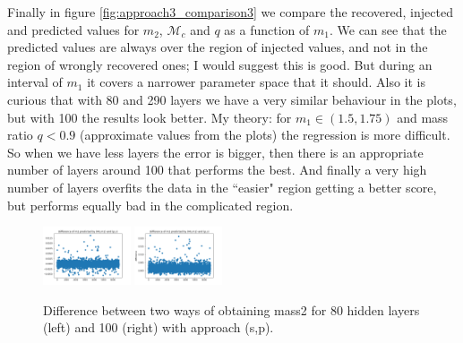 \documentclass[prd,aps,twocolumn,a4paper,showkeys,nofootinbib]{revtex4-1}
\begin{document}
Finally in figure \ref{fig:approach3_comparison3} we compare the recovered, injected and predicted values for $m_2$, $\mathcal{M}_c$ and $q$ as a function of $m_1$. We can see that the predicted values are always over the region of injected values, and not in the region of wrongly recovered ones; I would suggest this is good. But during an interval of $m_1$ it covers a narrower parameter space that it should. Also it is curious that with 80 and 290 layers we have a very similar behaviour in the plots, but with 100 the results look better.  My theory: for $m_1\in(1.5,1.75)$ and mass ratio $q<0.9$ (approximate values from the plots) the regression is more difficult. So when we have less layers the error is bigger, then there is an appropriate number of layers around 100 that performs the best. And finally a very high number of layers overfits the data in the ``easier" region getting a better score, but performs equally bad in the complicated region.
%
\begin{figure}[]
  \center
  \includegraphics[width=0.23\textwidth]{./Figs/80_m2_dif}
  \includegraphics[width=0.23\textwidth]{./Figs/100_m2_dif}
  \caption{\label{fig:approach3_comparison2} Difference between two ways of obtaining mass2 for 80 hidden layers (left) and 100 (right) with approach (s,p).}
\end{figure}
%
\end{document}
